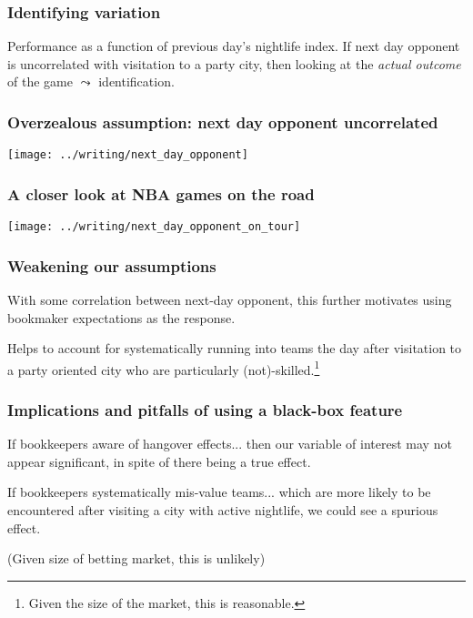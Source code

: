 \documentclass{beamer}
\begin{document}
\begin{frame}   \frametitle{Identifying variation}
  \begin{block}{Performance as a function of previous day's nightlife index.}     If next day opponent is uncorrelated with visitation to a party city,
    then looking at the \emph{actual outcome} of the game $\leadsto$ identification.
  \end{block}
\end{frame}

\begin{frame}   \frametitle{Overzealous assumption: next day opponent uncorrelated}
  \centering \texttt{[image: ../writing/next\_day\_opponent]} 
\end{frame}

\begin{frame}   \frametitle{A closer look at NBA games on the road}
  \centering \texttt{[image: ../writing/next\_day\_opponent\_on\_tour]} 
\end{frame}

\begin{frame}
  \frametitle{Weakening our assumptions}
  \begin{block}{With some correlation between next-day opponent, this further motivates using bookmaker expectations as the response.}
    
    Helps to account for systematically running into teams the day after visitation to 
    a party oriented city who are particularly (not)-skilled.\footnote{Given the size of the market, this is reasonable.}
  \end{block}
\end{frame}

\begin{frame}
  \frametitle{Implications and pitfalls of using a black-box feature}
  \begin{block}{If bookkeepers aware of hangover effects...}     then our variable of interest may not appear significant, in spite of there being a true effect.   \end{block}
  \vspace{12pt}
  \begin{block}{If bookkeepers systematically mis-value teams...}
     which are more likely to be encountered after visiting a city with active nightlife, we could see a spurious effect.

      (Given size of betting market, this is unlikely)
    \end{block}   
\end{frame}
\end{document}
